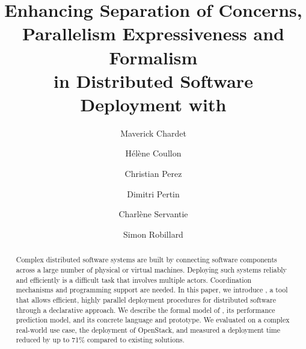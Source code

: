\documentclass[5p]{elsarticle}
\begin{document}
\begin{frontmatter}

  \title{Enhancing Separation of Concerns, Parallelism Expressiveness and 
  Formalism\\ in Distributed Software Deployment with \mad}

  \author[label1]{Maverick Chardet}
  \author[label1]{Hélène Coullon}
  \author[label2]{Christian Perez}
  \author[label1]{Dimitri Pertin}
  \author[label1]{Charlène Servantie}
  \author[label1]{Simon Robillard}

\address[label1]{IMT Atlantique, Inria, LS2N, UBL, F-44307 Nantes, France}
\address[label2]{Univ Lyon, Inria, EnsL, UCBL, CNRS, LIP, Lyon, France}


\begin{abstract}
Complex distributed software systems are built by connecting software
components across a large number of physical or virtual machines.
Deploying such systems reliably and efficiently is a difficult task
that involves multiple actors. Coordination mechanisms and programming
support are needed.
%
In this paper, we introduce \mad, a tool that allows efficient,
highly parallel deployment procedures for distributed software
through a declarative approach. We describe the formal model of \mad,
its performance prediction model, and its concrete language and
prototype. We evaluated \mad on a complex real-world use case, the
deployment of OpenStack, and measured a deployment time reduced by up
to 71\% compared to existing solutions.


\end{abstract}
\end{frontmatter}
\end{document}
